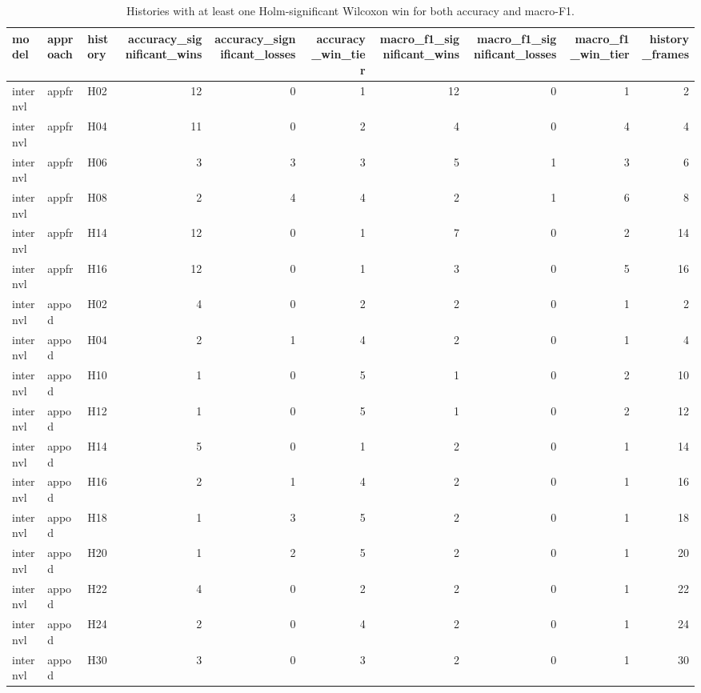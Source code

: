 \begin{table}
\caption{Histories with at least one Holm-significant Wilcoxon win for both accuracy and macro-F1.}
\label{tab:rq3-common-significant-histories}
\begin{tabular}{lllrrrrrrr}
\toprule
model & approach & history & accuracy\_significant\_wins & accuracy\_significant\_losses & accuracy\_win\_tier & macro\_f1\_significant\_wins & macro\_f1\_significant\_losses & macro\_f1\_win\_tier & history\_frames \\
\midrule
internvl & appfr & H02 & 12 & 0 & 1 & 12 & 0 & 1 & 2 \\
internvl & appfr & H04 & 11 & 0 & 2 & 4 & 0 & 4 & 4 \\
internvl & appfr & H06 & 3 & 3 & 3 & 5 & 1 & 3 & 6 \\
internvl & appfr & H08 & 2 & 4 & 4 & 2 & 1 & 6 & 8 \\
internvl & appfr & H14 & 12 & 0 & 1 & 7 & 0 & 2 & 14 \\
internvl & appfr & H16 & 12 & 0 & 1 & 3 & 0 & 5 & 16 \\
internvl & appod & H02 & 4 & 0 & 2 & 2 & 0 & 1 & 2 \\
internvl & appod & H04 & 2 & 1 & 4 & 2 & 0 & 1 & 4 \\
internvl & appod & H10 & 1 & 0 & 5 & 1 & 0 & 2 & 10 \\
internvl & appod & H12 & 1 & 0 & 5 & 1 & 0 & 2 & 12 \\
internvl & appod & H14 & 5 & 0 & 1 & 2 & 0 & 1 & 14 \\
internvl & appod & H16 & 2 & 1 & 4 & 2 & 0 & 1 & 16 \\
internvl & appod & H18 & 1 & 3 & 5 & 2 & 0 & 1 & 18 \\
internvl & appod & H20 & 1 & 2 & 5 & 2 & 0 & 1 & 20 \\
internvl & appod & H22 & 4 & 0 & 2 & 2 & 0 & 1 & 22 \\
internvl & appod & H24 & 2 & 0 & 4 & 2 & 0 & 1 & 24 \\
internvl & appod & H30 & 3 & 0 & 3 & 2 & 0 & 1 & 30 \\
\bottomrule
\end{tabular}
\end{table}

